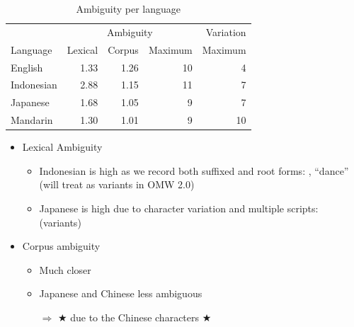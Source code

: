 \documentclass[a4paper,landscape,headrule,footrule,xetex]{foils}
\begin{document}
\begin{table}[tbp]
  \centering
\begin{tabular}{lrrrr}
            & \multicolumn{3}{c}{Ambiguity} & Variation \\
 Language   &   Lexical & Corpus  &   Maximum & Maximum \\
\hline
 English    & 1.33   &    1.26 &              10 &               4 \\
 Indonesian & 2.88   &    1.15 &              11 &               7 \\
 Japanese   & 1.68   &    1.05 &               9 &               7 \\
 Mandarin   & 1.30   &    1.01 &               9 &              10 \\
\end{tabular}
 \caption{Ambiguity per language}
  \label{tab:ambi}
\end{table}
\begin{itemize}
\item Lexical Ambiguity
  \begin{itemize}
  \item Indonesian is high as we record both suffixed and root forms: 
    ,  ``dance'' (will treat as variants in OMW
2.0)
\item Japanese is high due to character variation
  and multiple scripts: \\   (variants)
\end{itemize}
\item Corpus ambiguity
  \begin{itemize}
  \item Much closer
  \item Japanese and Chinese less ambiguous
  \item [$\Rightarrow$] ★ due to the Chinese characters ★%
  \end{itemize}
\end{itemize}
\end{document}
